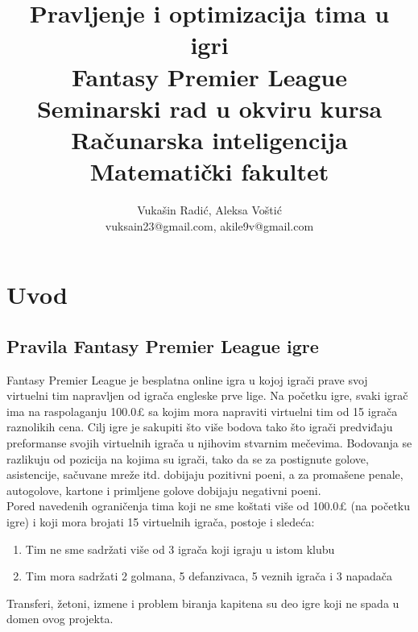\documentclass[a4paper]{article}
\begin{document}
\title{Pravljenje i optimizacija tima u igri \\
Fantasy Premier League \\ 
\vspace{2mm} \small {Seminarski rad u okviru kursa\\Računarska inteligencija\\ Matematički fakultet}}

\author{Vukašin Radić, Aleksa Voštić\\ vuksain23@gmail.com, akile9v@gmail.com}



\maketitle



\tableofcontents

\newpage

\section{Uvod}
\label{sec:uvod}


\subsection{Pravila Fantasy Premier League igre}
\vspace{3mm} 
Fantasy Premier League je besplatna online igra u kojoj igrači prave svoj virtuelni tim napravljen od igrača engleske prve lige. Na početku igre, svaki igrač ima na raspolaganju 100.0£ sa kojim mora napraviti virtuelni tim od 15 igrača raznolikih cena. Cilj igre je sakupiti što više bodova tako što igrači predviđaju preformanse svojih virtuelnih igrača u njihovim stvarnim mečevima. Bodovanja se razlikuju od pozicija na kojima su igrači, tako da se za postignute golove, asistencije, sačuvane mreže itd. dobijaju pozitivni poeni, a za promašene penale, autogolove, kartone i primljene golove dobijaju negativni poeni. \\

Pored navedenih ograničenja tima koji ne sme koštati više od 100.0£ (na početku igre) i koji mora brojati 15 virtuelnih igrača, postoje i sledeća:
\begin{enumerate}
  \item Tim ne sme sadržati više od 3 igrača koji igraju u istom klubu
  \item Tim mora sadržati 2 golmana, 5 defanzivaca, 5 veznih igrača i 3 napadača
\end{enumerate} 
\vspace{5mm} %
Transferi, žetoni, izmene i problem biranja kapitena su deo igre koji ne spada u domen ovog projekta.
\end{document}
